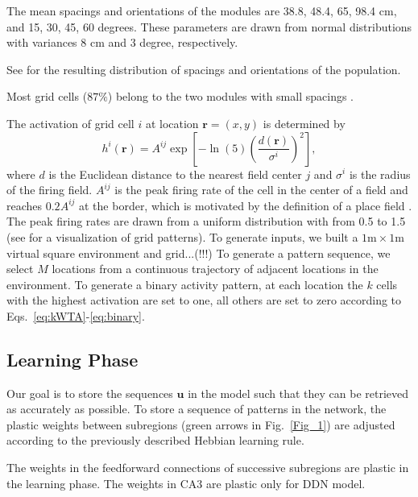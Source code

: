 \documentclass[utf8]{frontiersSCNS} %
\begin{document}
The mean spacings and orientations of the modules are 38.8, 48.4, 65, 98.4 cm, and 15, 30, 45, 60 degrees. These parameters are drawn from normal distributions with variances 8 cm and 3 degree, respectively.

See \cite[Fig 1B-1C]{neher2015memory} for the resulting distribution of spacings and orientations of the population.

Most grid cells ($87\%$) belong to the two modules with small spacings \cite{stensola2012entorhinal}. 

The activation of grid cell $i$ at location $\mathbf{r}=(x,y)$ is determined by
\begin{equation}
\label{eq:grid}
h^i(\mathbf{r}) = A^{ij} \exp \left[ -\ln(5) \left(\frac{d(\mathbf{r})}{\sigma^i}\right)^2 \right],
\end{equation}
where $d$ is the Euclidean distance to the nearest field center $j$ and $\sigma^i$ is the radius of the firing field. $A^{ij}$ is the peak firing rate of the cell in the center of a field and reaches $0.2 A^{ij}$ at the border, which is motivated by the definition of a place field \cite{hafting2005microstructure}. The peak firing rates are drawn from a uniform distribution with from 0.5 to 1.5 (see \cite{neher2015memory} for a visualization of grid patterns). 
To generate inputs, we built a $1\textrm{m} \times 1\textrm{m}$ virtual square environment and grid...(!!!) 
To generate a pattern sequence, we select $M$ locations from a continuous trajectory of adjacent locations in the environment. To generate a binary activity pattern, at each location the $k$ cells with the highest activation are set to one, all others are set to zero according to Eqs.~\ref{eq:kWTA}-\ref{eq:binary}.


\subsection{Learning Phase}


Our goal is to store the sequences $\mathbf u$ in the model such that they can be retrieved as accurately as possible. To store a sequence of patterns in the network, the plastic weights between subregions (green arrows in Fig.~\ref{Fig_1}) are adjusted according to the previously described Hebbian learning rule. 

The weights in the feedforward connections of successive subregions are plastic in the learning phase. The weights in CA3 are plastic only for DDN model.
\end{document}
